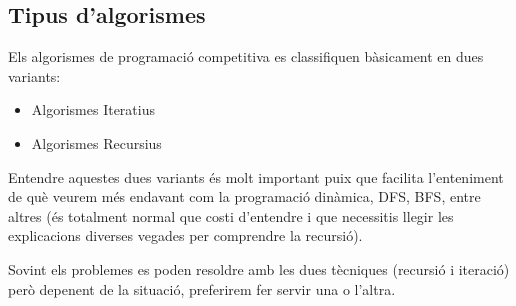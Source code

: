 \subsection{Tipus d'algorismes}

Els algorismes de programació competitiva es classifiquen bàsicament en dues variants:

\begin{itemize}
    \item Algorismes Iteratius
    \item Algorismes Recursius
\end{itemize}

Entendre aquestes dues variants és molt important puix que facilita l'enteniment de què veurem més endavant com la programació dinàmica, DFS, BFS, entre altres (és totalment normal que costi d'entendre i que necessitis llegir les explicacions diverses vegades per comprendre la recursió). \newline

Sovint els problemes es poden resoldre amb les dues tècniques (recursió i iteració) però depenent de la situació, preferirem fer servir una o l'altra. \newline